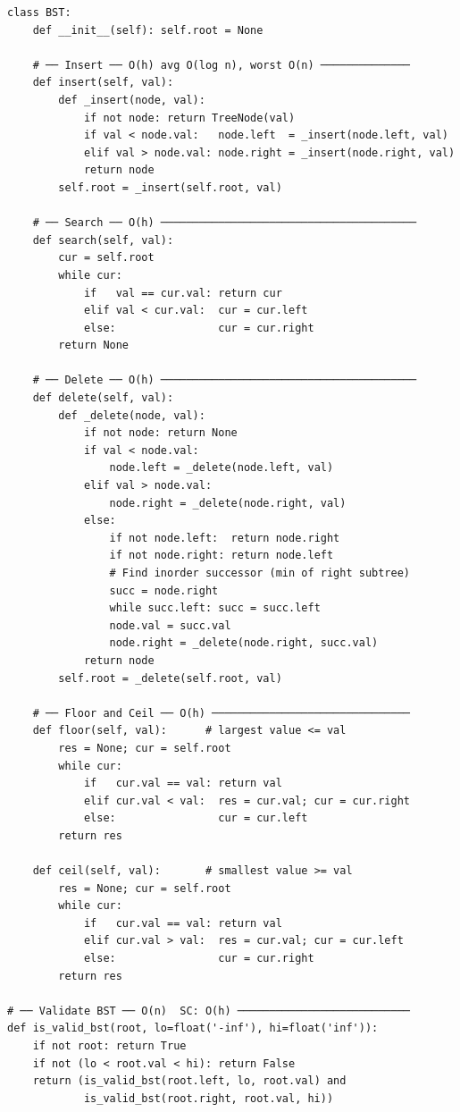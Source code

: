 \documentclass[11pt,a4paper]{report}
\begin{document}
\begin{lstlisting}
class BST:
    def __init__(self): self.root = None

    # ── Insert ── O(h) avg O(log n), worst O(n) ──────────────
    def insert(self, val):
        def _insert(node, val):
            if not node: return TreeNode(val)
            if val < node.val:   node.left  = _insert(node.left, val)
            elif val > node.val: node.right = _insert(node.right, val)
            return node
        self.root = _insert(self.root, val)

    # ── Search ── O(h) ────────────────────────────────────────
    def search(self, val):
        cur = self.root
        while cur:
            if   val == cur.val: return cur
            elif val < cur.val:  cur = cur.left
            else:                cur = cur.right
        return None

    # ── Delete ── O(h) ────────────────────────────────────────
    def delete(self, val):
        def _delete(node, val):
            if not node: return None
            if val < node.val:
                node.left = _delete(node.left, val)
            elif val > node.val:
                node.right = _delete(node.right, val)
            else:
                if not node.left:  return node.right
                if not node.right: return node.left
                # Find inorder successor (min of right subtree)
                succ = node.right
                while succ.left: succ = succ.left
                node.val = succ.val
                node.right = _delete(node.right, succ.val)
            return node
        self.root = _delete(self.root, val)

    # ── Floor and Ceil ── O(h) ───────────────────────────────
    def floor(self, val):      # largest value <= val
        res = None; cur = self.root
        while cur:
            if   cur.val == val: return val
            elif cur.val < val:  res = cur.val; cur = cur.right
            else:                cur = cur.left
        return res

    def ceil(self, val):       # smallest value >= val
        res = None; cur = self.root
        while cur:
            if   cur.val == val: return val
            elif cur.val > val:  res = cur.val; cur = cur.left
            else:                cur = cur.right
        return res

# ── Validate BST ── O(n)  SC: O(h) ───────────────────────────
def is_valid_bst(root, lo=float('-inf'), hi=float('inf')):
    if not root: return True
    if not (lo < root.val < hi): return False
    return (is_valid_bst(root.left, lo, root.val) and
            is_valid_bst(root.right, root.val, hi))


\end{lstlisting}
\end{document}

